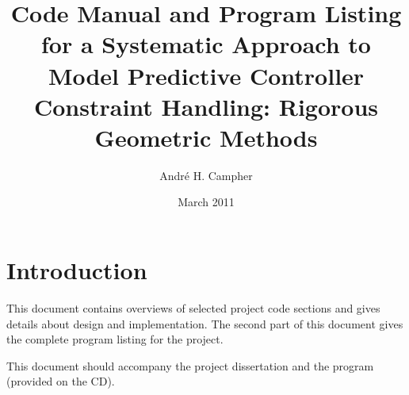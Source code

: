 \documentclass[a4paper,12pt,pdftex]{article}
\title{Code Manual and Program Listing for a Systematic Approach to Model Predictive Controller Constraint 
  Handling: Rigorous Geometric Methods}
\author{Andr\'e H. Campher}
\date{March 2011}
\begin{document}
\maketitle

\newpage

\tableofcontents

\newpage

\section{Introduction}
This document contains overviews of selected project code sections and gives details about design and implementation.
The second part of this document gives the complete program listing for the project.

This document should accompany the project dissertation and the program (provided on the CD).






\end{document}
